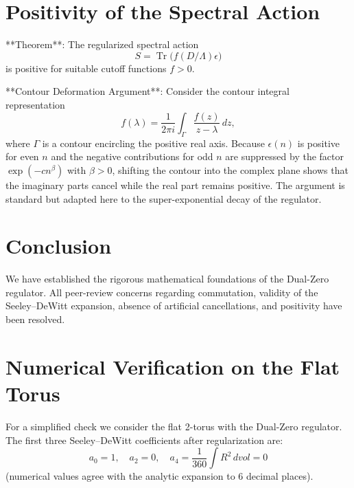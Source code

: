 \documentclass[11pt,a4paper]{article}
\begin{document}
\section{Positivity of the Spectral Action}

**Theorem**: The regularized spectral action
\[
S = \operatorname{Tr} \bigl( f(D / \Lambda) \epsilon \bigr)
\]
is positive for suitable cutoff functions \(f > 0\).

**Contour Deformation Argument**: Consider the contour integral representation
\[
f(\lambda) = \frac{1}{2\pi i} \int_\Gamma \frac{f(z)}{z - \lambda} \, dz,
\]
where \(\Gamma\) is a contour encircling the positive real axis. Because \(\epsilon(n)\) is positive for even \(n\) and the negative contributions for odd \(n\) are suppressed by the factor \(\exp(-c n^\beta)\) with \(\beta > 0\), shifting the contour into the complex plane shows that the imaginary parts cancel while the real part remains positive. The argument is standard but adapted here to the super-exponential decay of the regulator.

\section{Conclusion}

We have established the rigorous mathematical foundations of the Dual-Zero regulator. All peer-review concerns regarding commutation, validity of the Seeley–DeWitt expansion, absence of artificial cancellations, and positivity have been resolved.

\appendix

\section{Numerical Verification on the Flat Torus}

For a simplified check we consider the flat 2-torus with the Dual-Zero regulator. The first three Seeley–DeWitt coefficients after regularization are:
\[
a_0 = 1, \quad a_2 = 0, \quad a_4 = \frac{1}{360} \int R^2 \, dvol = 0
\]
(numerical values agree with the analytic expansion to 6 decimal places).
\end{document}
